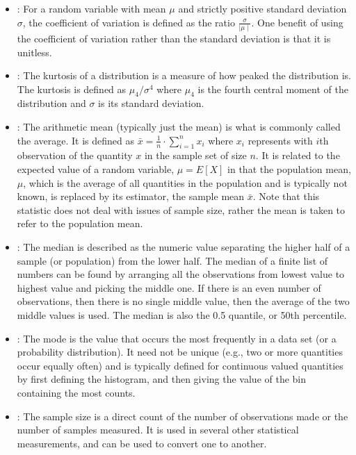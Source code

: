 \documentclass[draftspec]{sbmlpkgspec}
\begin{document}
\begin{itemize}

\item {}:  For a random variable with mean $ \mu $ and strictly positive standard deviation $ \sigma $, the coefficient of variation is defined as the ratio $ \frac{\sigma}{\mid\mu\mid} $. One benefit of using the coefficient of variation rather than the standard deviation is that it is unitless.

\item {}:  The kurtosis of a distribution is a measure of how peaked the distribution is. The kurtosis is defined as $ \mu_4/\sigma^4 $ where $ \mu_4 $ is the fourth central moment of the distribution and $ \sigma $ is its standard deviation.

\item {}:  The arithmetic mean (typically just the mean) is what is commonly called the average. It is defined as $ \bar{x} = \frac{1}{n}\cdot \sum_{i=1}^n{x_i} $ where $ x_i $ represents with $ i $th observation of the quantity $ x $ in the sample set of size $ n $. It is related to the expected value of a random variable, $ \mu = E[X] $ in that the population mean, $ \mu $, which is the average of all quantities in the population and is typically not known, is replaced by its estimator, the sample mean $ \bar{x} $. Note that this statistic does not deal with issues of sample size, rather the mean is taken to refer to the population mean.

\item {}:  The median is described as the numeric value separating the higher half of a sample (or population) from the lower half. The median of a finite list of numbers can be found by arranging all the observations from lowest value to highest value and picking the middle one. If there is an even number of observations, then there is no single middle value, then the average of the two middle values is used. The median is also the 0.5 quantile, or 50th percentile.

\item {}:  The mode is the value that occurs the most frequently in a data set (or a probability distribution). It need not be unique (e.g., two or more quantities occur equally often) and is typically defined for continuous valued quantities by first defining the histogram, and then giving the  value of the bin containing the most counts.

\item {}:  The sample size is a direct count of the number of observations made or the number of samples measured.  It is used in several other statistical measurements, and can be used to convert one to another.


\end{itemize}
\end{document}
